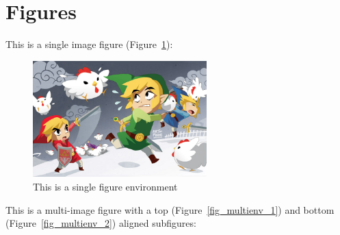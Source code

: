 \section{Figures}
This is a single image figure (Figure~\ref{fig_singleenv}):

\begin{figure}[ht]
    \centering
    \includegraphics[width=0.6\textwidth]{figures/Sample/tumblr_static_eaceks0rfxsss8o4swscw40wo.jpg}
    \caption[Single Figure Environment Listed Title]{This is a single figure 
    environment}
    \label{fig_singleenv}
\end{figure}

This is a multi-image figure with a top (Figure~\ref{fig_multienv_1}) and bottom (Figure~\ref{fig_multienv_2}) aligned subfigures:

